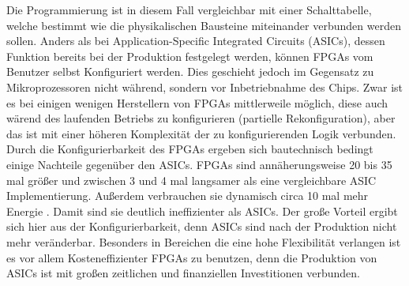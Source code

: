 Die Programmierung ist in diesem Fall vergleichbar mit einer Schalttabelle, welche bestimmt wie die physikalischen Bausteine miteinander verbunden werden sollen. Anders als bei Application-Specific Integrated Circuits
(ASICs), dessen Funktion bereits bei der Produktion festgelegt werden, können FPGAs vom Benutzer selbst Konfiguriert werden. \newpage 
Dies geschieht jedoch im Gegensatz zu Mikroprozessoren nicht während, sondern vor Inbetriebnahme des Chips. Zwar ist es bei
einigen wenigen Herstellern von FPGAs mittlerweile möglich, diese auch wärend des laufenden Betriebs zu konfigurieren (partielle Rekonfiguration), aber das ist mit einer höheren
Komplexität der zu konfigurierenden Logik verbunden.\\
Durch die Konfigurierbarkeit des FPGAs ergeben sich bautechnisch bedingt einige Nachteile gegenüber den ASICs. FPGAs sind annäherungsweise 20 bis 35 mal größer und zwischen 3 und 4 mal langsamer als eine vergleichbare ASIC Implementierung. Außerdem verbrauchen sie dynamisch circa 10 mal mehr Energie \cite{KURO}.
Damit sind sie deutlich ineffizienter als ASICs. Der große Vorteil ergibt sich hier aus der Konfigurierbarkeit, denn ASICs sind nach der Produktion nicht mehr veränderbar. Besonders in Bereichen die eine hohe Flexibilität verlangen ist es vor allem Kosteneffizienter FPGAs zu benutzen, denn die Produktion von ASICs ist mit großen zeitlichen und finanziellen Investitionen verbunden\cite{KUTERO}.
